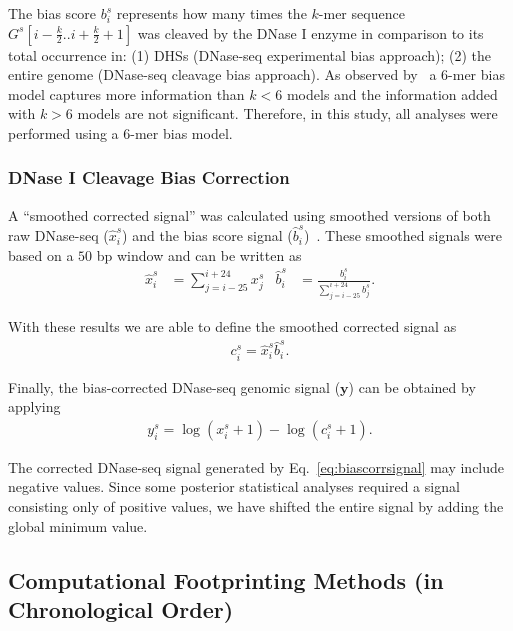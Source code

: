 \documentclass[11pt]{article}
\begin{document}
The bias score ${b}_{i}^{s}$ represents how many times the $k$-mer sequence $G^s[i-\frac{k}{2}..i+\frac{k}{2}+1]$ was cleaved by the DNase I enzyme in comparison to its total occurrence in: (1) DHSs (DNase-seq experimental bias approach); (2) the entire genome (DNase-seq cleavage bias approach). As observed by~\cite{he2014} a $6$-mer bias model captures more information than $k < 6$ models and the information added with $k > 6$ models are not significant. Therefore, in this study, all analyses were performed using a $6$-mer bias model.

\subsubsection{DNase I Cleavage Bias Correction}
\label{sec:bias-correction}

A ``smoothed corrected signal'' was calculated using smoothed versions of both raw DNase-seq (${\hat{x}}_{i}^{s}$) and the bias score signal (${\hat{b}}_{i}^{s}$)~\citep{he2014}. These smoothed signals were based on a $50$ bp window and can be written as
\begin{align}
  {\hat{x}}_{i}^{s} &= \sum_{j=i-25}^{i+24} {x}_{j}^{s} & {\hat{b}}_{i}^{s} &= \frac{{b}_{i}^{s}}{\sum_{j=i-25}^{i+24} {b}_{j}^{s}}.
  \label{eq:biassignal}
\end{align}

With these results we are able to define the smoothed corrected signal as
\begin{align}
  {c}_{i}^{s} = {\hat{x}}_{i}^{s} {\hat{b}}_{i}^{s}.
  \label{eq:biascorr}
\end{align}

Finally, the bias-corrected DNase-seq genomic signal ($\mathbf{y}$) can be obtained by applying
\begin{align}
  {y}_{i}^{s} = \log({x}_{i}^{s} + 1) - \log({c}_{i}^{s} + 1).
  \label{eq:biascorrsignal}
\end{align}

The corrected DNase-seq signal generated by Eq.~\ref{eq:biascorrsignal} may include negative values. Since some posterior statistical analyses required a signal consisting only of positive values, we have shifted the entire signal by adding the global minimum value.

\subsection{Computational Footprinting Methods (in Chronological Order)}
\label{sec:fp-methods}
\end{document}
